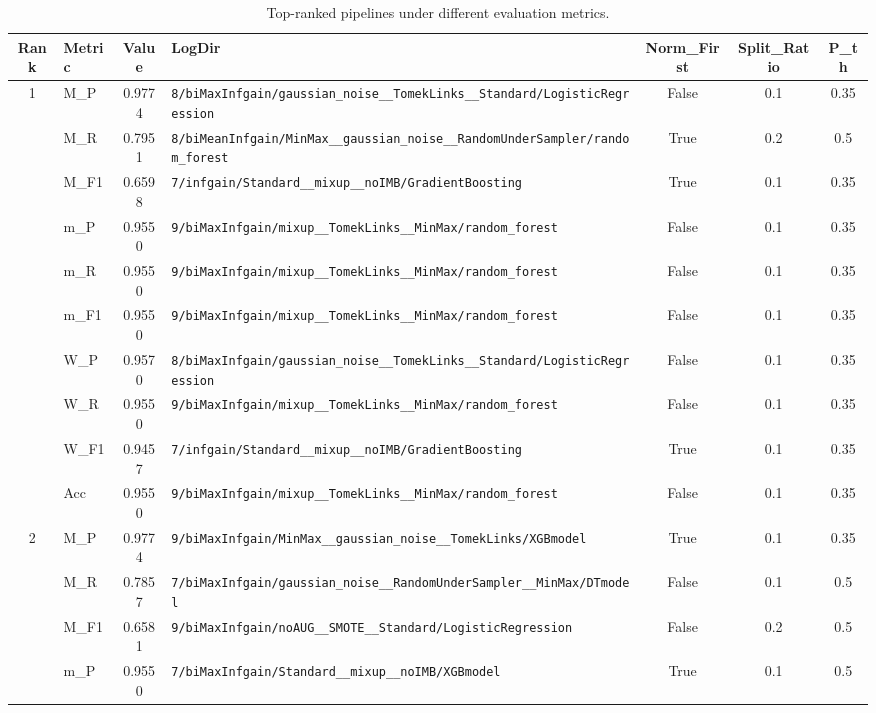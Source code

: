 \begin{table}[htbp]
\caption{Top-ranked pipelines under different evaluation metrics.}
\label{tab:rank_metric_vertical}
\centering
\small
\setlength{\tabcolsep}{4pt}
\begin{tabular}{|c|l|c|>{\ttfamily\footnotesize}p{7.2cm}|c|c|c|}
\hline
Rank & Metric & Value & LogDir & Norm\_First & Split\_Ratio & P\_th \\
\hline
\multirow{10}{*}{1} & M\_P & 0.9774 & \texttt{8/biMaxInfgain/gaussian\_noise\_\_TomekLinks\_\_Standard/LogisticRegression} & False & 0.1 & 0.35 \\
 & M\_R & 0.7951 & \texttt{8/biMeanInfgain/MinMax\_\_gaussian\_noise\_\_RandomUnderSampler/random\_forest} & True & 0.2 & 0.5 \\
 & M\_F1 & 0.6598 & \texttt{7/infgain/Standard\_\_mixup\_\_noIMB/GradientBoosting} & True & 0.1 & 0.35 \\
 & m\_P & 0.9550 & \texttt{9/biMaxInfgain/mixup\_\_TomekLinks\_\_MinMax/random\_forest} & False & 0.1 & 0.35 \\
 & m\_R & 0.9550 & \texttt{9/biMaxInfgain/mixup\_\_TomekLinks\_\_MinMax/random\_forest} & False & 0.1 & 0.35 \\
 & m\_F1 & 0.9550 & \texttt{9/biMaxInfgain/mixup\_\_TomekLinks\_\_MinMax/random\_forest} & False & 0.1 & 0.35 \\
 & W\_P & 0.9570 & \texttt{8/biMaxInfgain/gaussian\_noise\_\_TomekLinks\_\_Standard/LogisticRegression} & False & 0.1 & 0.35 \\
 & W\_R & 0.9550 & \texttt{9/biMaxInfgain/mixup\_\_TomekLinks\_\_MinMax/random\_forest} & False & 0.1 & 0.35 \\
 & W\_F1 & 0.9457 & \texttt{7/infgain/Standard\_\_mixup\_\_noIMB/GradientBoosting} & True & 0.1 & 0.35 \\
 & Acc & 0.9550 & \texttt{9/biMaxInfgain/mixup\_\_TomekLinks\_\_MinMax/random\_forest} & False & 0.1 & 0.35 \\
\hline
\multirow{10}{*}{2} & M\_P & 0.9774 & \texttt{9/biMaxInfgain/MinMax\_\_gaussian\_noise\_\_TomekLinks/XGBmodel} & True & 0.1 & 0.35 \\
 & M\_R & 0.7857 & \texttt{7/biMaxInfgain/gaussian\_noise\_\_RandomUnderSampler\_\_MinMax/DTmodel} & False & 0.1 & 0.5 \\
 & M\_F1 & 0.6581 & \texttt{9/biMaxInfgain/noAUG\_\_SMOTE\_\_Standard/LogisticRegression} & False & 0.2 & 0.5 \\
 & m\_P & 0.9550 & \texttt{7/biMaxInfgain/Standard\_\_mixup\_\_noIMB/XGBmodel} & True & 0.1 & 0.5 \\

\end{tabular}
\end{table}
